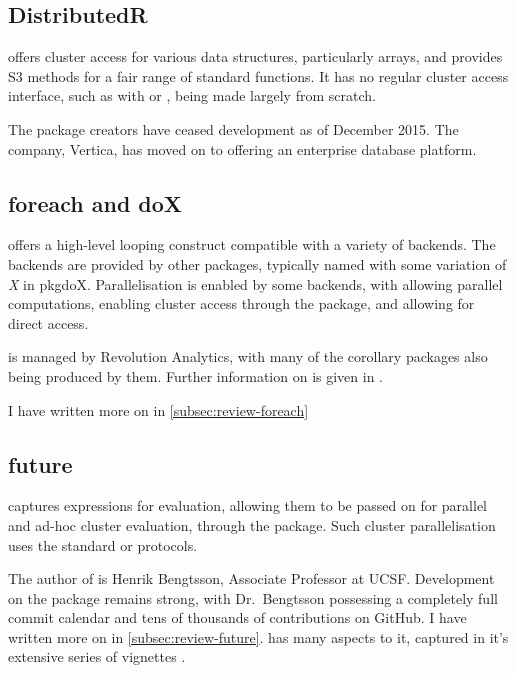 \subsection{DistributedR}\label{subsec:distributedr}

 offers cluster access for various \R{} data structures,
particularly arrays, and provides S3 methods for a fair range of
standard functions. It has no regular cluster access interface, such as
with  or , being made largely from scratch.

The package creators have ceased development as of December 2015. The
company, Vertica, has moved on to offering an enterprise database
platform\cite{vertica:_distr}.

\subsection{foreach and doX}\label{subsec:foreach-doc}

 offers a high-level looping construct compatible with a variety
of backends\cite{microsoft20}. The backends are provided by other
packages, typically named with some variation of \emph{X} in pkg{doX}.
Parallelisation is enabled by some backends, with  allowing
parallel computations\cite{corporation19},  enabling cluster
access through the  package\cite{dosnow19}, and  allowing for
direct  access\cite{weston17}.

 is managed by Revolution Analytics, with many of the 
corollary packages also being produced by them. Further information on
 is given in \cite{weston19:_using}.

I have written more on  in \cref{subsec:review-foreach}

\subsection{future}\label{subsec:future-furrr}

 captures \R{} expressions for evaluation, allowing them to be passed
on for parallel and ad-hoc cluster evaluation, through the 
package\cite{bengtsson20}. Such cluster parallelisation uses the standard  or
 protocols.

The author of  is Henrik Bengtsson, Associate Professor at UCSF.
Development on the package remains strong, with Dr.~Bengtsson possessing
a completely full commit calendar and tens of thousands of contributions on GitHub. I
have written more on  in \cref{subsec:review-future}.  has many aspects to it, captured in it's
extensive series of vignettes\cites{bengtsson20:future-r,bengtsson20:future-r2}
\cites{bengtsson20:future-r3,bengtsson20:future-r4,bengtsson20:future-r5,bengtsson20:future-r6}.

